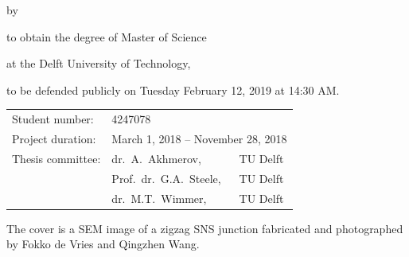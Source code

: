 \begin{titlepage}


\begin{center}


{\makeatletter
\largetitlestyle\fontsize{64}{94}\selectfont\@title
\makeatother}

{\makeatletter
\ifx\@subtitle\undefined\else
    \bigskip
   {\tudsffamily\fontsize{22}{32}\selectfont\@subtitle}    
\fi
\makeatother}

\bigskip
\bigskip

by

\bigskip
\bigskip

{\makeatletter
\largetitlestyle\fontsize{26}{26}\selectfont\@author
\makeatother}

\bigskip
\bigskip

to obtain the degree of Master of Science

at the Delft University of Technology,

to be defended publicly on Tuesday February 12, 2019 at 14:30 AM.

\vfill

\begin{tabular}{lll}
    Student number: & 4247078 \\
    Project duration: & \multicolumn{2}{l}{March 1, 2018 -- November 28, 2018} \\
    Thesis committee: & dr.\ A.\ Akhmerov, & TU Delft \\
                      & Prof.\ dr.\ G.A.\ Steele, & TU Delft \\
                      & dr.\ M.T.\ Wimmer, & TU Delft \\
\end{tabular}

\bigskip
\bigskip

The cover is a SEM image of a zigzag SNS junction fabricated and photographed by Fokko de Vries and Qingzhen Wang.
\bigskip


\end{center}
\end{titlepage}
